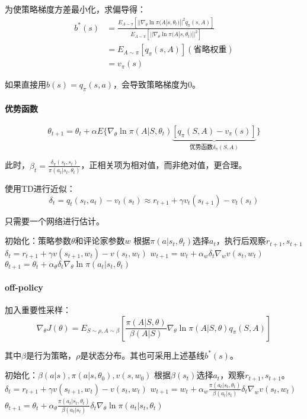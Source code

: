 \documentclass[
12pt, %
a4paper, 
oneside, %
headinclude,footinclude, %
]{scrartcl}
\begin{document}
为使策略梯度方差最小化，求偏导得：
\begin{align*}
b^*(s) &= \frac{E_{A\sim\pi}[||\nabla_\theta\ln\pi(A|s,\theta_t)||^2 q_\pi(s,A)]}{E_{A\sim\pi}[||\nabla_\theta\ln\pi(A|s,\theta_t)||^2]} \\
&= E_{A\sim\pi}[q_\pi(s,A)] (\text{省略权重}) \\
&= v_{\pi}(s)
\end{align*}

如果直接用$ b(s) = q_{\pi}(s, a) $，会导致策略梯度为$ 0 $。
\paragraph{优势函数}
$$ \theta_{t + 1} = \theta_t + \alpha E\{\nabla_\theta \ln \pi(A|S, \theta_t) \underbrace{[q_\pi(S, A) - v_{\pi}(s)]}_{\text{优势函数}\delta_{\pi}(S, A)}\} $$

此时，$ \beta_t = \frac{\delta_{\pi}(s_t, s_t)}{\pi(a_t|s_t, \theta_t)} $，正相关项为相对值，而非绝对值，更合理。

使用TD进行近似：
$$ \delta_t = q_t(s_t, a_t) - v_t(s_t) \approx r_{t + 1} + \gamma v_t(s_{t + 1}) - v_t(s_t) $$

只需要一个网络进行估计。
\begin{myalgorithm}[A2C]
\State 初始化：策略参数$ \theta $和评论家参数$ w $
\State 根据$ \pi(a|s_t, \theta_t) $选择$ a_t $，执行后观察$ r_{t + 1}, s_{t + 1} $
\State $ \delta_t = r_{t + 1} + \gamma v(s_{t + 1}, w_t) - v(s_t, w_t) $ 
\State $ w_{t + 1} = w_t + \alpha_w \delta_t \nabla_w v(s_t, w_t) $ 
\State $ \theta_{t + 1} = \theta_t + \alpha_\theta \delta_t \nabla_\theta \ln \pi(a_t|s_t, \theta_t) $ 
\EndFor
\EndFor
\end{myalgorithm}
\paragraph{off-policy}
加入重要性采样：
$$ \nabla_\theta J(\theta) = E_{S \sim \rho, A \sim \beta}[\frac{\pi(A|S,\theta)}{\beta(A|S)}\nabla_\theta\ln\pi(A|S,\theta)q_\pi(S,A)] $$

其中$ \beta $是行为策略，$ \rho $是状态分布。其也可采用上述基线$ b^*(s) $。
\begin{myalgorithm}
\State 初始化：$ \beta(a|s), \pi(a|s,\theta_0), v(s,w_0) $
\State 根据$ \beta(s_t) $选择$ a_t $，观察$ r_{t + 1}, s_{t + 1} $。
\State $ \delta_t = r_{t + 1} + \gamma v(s_{t + 1}, w_t) - v(s_t, w_t) $ 
\State $ w_{t + 1} = w_t + \alpha_w \frac{\pi(a_t|s_t,\theta_t)}{\beta(a_t|s_t)} \delta_t \nabla_w v(s_t, w_t) $ 
\State $ \theta_{t + 1} = \theta_t + \alpha_\theta \frac{\pi(a_t|s_t,\theta_t)}{\beta(a_t|s_t)} \delta_t \nabla_\theta \ln \pi(a_t|s_t, \theta_t) $ 
\EndFor
\EndFor
\end{myalgorithm}
\end{document}
